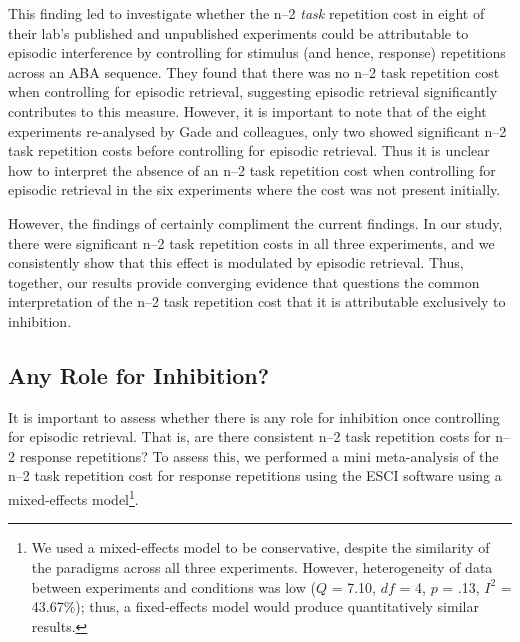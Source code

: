 \documentclass[a4paper, doc, natbib]{apa6}
\begin{document}
This finding led \cite{Gadeinpress} to investigate whether the n--2 \emph{task} repetition cost in eight of their lab's published and unpublished experiments could be attributable to episodic interference by controlling for stimulus (and hence, response) repetitions across an ABA sequence. They found that there was no n--2 task repetition cost when controlling for episodic retrieval, suggesting episodic retrieval significantly contributes to this measure. However, it is important to note that of the eight experiments re-analysed by Gade and colleagues, only two showed significant n--2 task repetition costs before controlling for episodic retrieval. Thus it is unclear how to interpret the absence of an n--2 task repetition cost when controlling for episodic retrieval in the six experiments where the cost was not present initially.

However, the findings of \cite{Gadeinpress} certainly compliment the current findings. In our study, there were significant n--2 task repetition costs in all three experiments, and we consistently show that this effect is modulated by episodic retrieval. Thus, together, our results provide converging evidence that questions the common interpretation of the n--2 task repetition cost that it is attributable exclusively to inhibition. 

\subsection{Any Role for Inhibition?}
It is important to assess whether there is any role for inhibition once controlling for episodic retrieval. That is, are there consistent n--2 task repetition costs for n--2 response repetitions? To assess this, we performed a mini meta-analysis of the n--2 task repetition cost for response repetitions using the ESCI software \citep{Cumming2012} using a mixed-effects model\footnote{We used a mixed-effects model to be conservative, despite the similarity of the paradigms across all three experiments. However, heterogeneity of data between experiments and conditions was low ($Q$ = 7.10, $df$ = 4, $p$ = .13, $I^{2}$ = 43.67\%); thus, a fixed-effects model would produce quantitatively similar results.}. 
\end{document}
